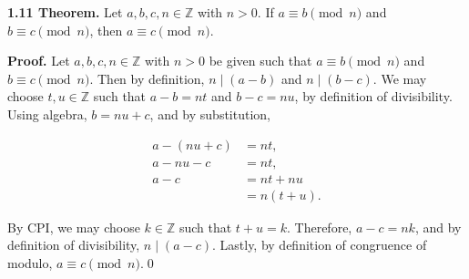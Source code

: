 \documentclass[12pt]{article}
\begin{document}
\noindent\textbf{1.11 Theorem.} Let $a,b,c,n\in\mathbb{Z}$ with $n>0$. If $a\equiv b\pmod{n}$ and $b\equiv c\pmod{n}$, then $a\equiv c\pmod{n}$.

\bigskip

\noindent\textbf{Proof.} Let $a,b,c,n\in\mathbb{Z}$ with $n>0$ be given such that $a\equiv b\pmod{n}$ and $b\equiv c\pmod{n}$. Then by definition, $n\mid(a-b)$ and $n\mid(b-c)$. We may choose $t,u\in\mathbb{Z}$ such that $a-b=nt$ and $b-c=nu$, by definition of divisibility. Using algebra, $b=nu+c$, and by substitution,


\begin{align*}
a-(nu+c) &= nt, \\
a-nu-c &= nt, \\
a-c &= nt+nu \\
&= n(t+u).
\end{align*}

\noindent By CPI, we may choose $k\in\mathbb{Z}$ such that $t+u=k$. Therefore, $a-c=nk$, and by definition of divisibility, $n\mid(a-c)$. Lastly, by definition of congruence of modulo, $a\equiv c\pmod{n}$.\qed
\end{document}
